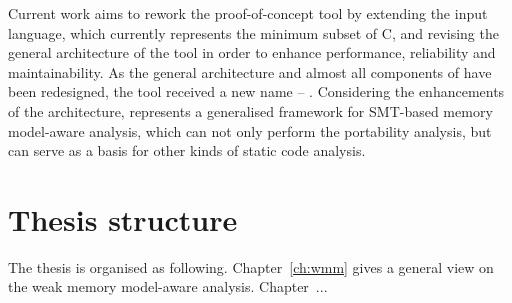 Current work aims to rework the proof-of-concept tool \porthos by extending the input language, which currently represents the minimum subset of C, and revising the general architecture of the tool in order to enhance performance, reliability and maintainability.
As the general architecture and almost all components of \porthos have been redesigned, the tool received a new name -- \porthos[2].
Considering the enhancements of the architecture, \porthos[2] represents a generalised framework for SMT-based memory model-aware analysis, which can not only perform the portability analysis, but can serve as a basis for other kinds of static code analysis.


\section{Thesis structure}
\label{ch:intro:structure}

The thesis is organised as following. Chapter~\ref{ch:wmm} gives a general view on the weak memory model-aware analysis. Chapter~...


